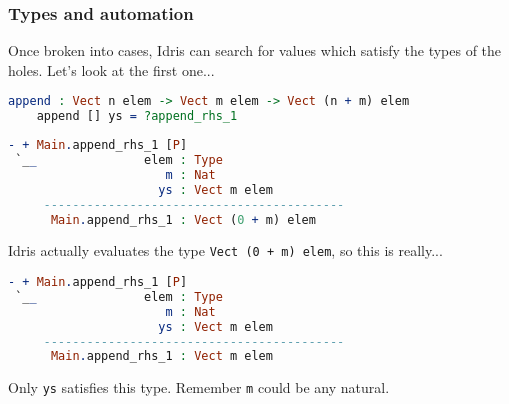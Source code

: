 \documentclass{beamer}
\begin{document}
\begin{frame}[fragile]
  \frametitle{Types and automation}

  Once broken into cases, Idris can search for values which satisfy the types of the holes. Let's look at the first one...

  \pause

  \begin{lstlisting}[language=Idris]
    append : Vect n elem -> Vect m elem -> Vect (n + m) elem
    append [] ys = ?append_rhs_1
  \end{lstlisting}

  \begin{lstlisting}[language=Idris]
- + Main.append_rhs_1 [P]
 `__               elem : Type
                      m : Nat
                     ys : Vect m elem
     ------------------------------------------
      Main.append_rhs_1 : Vect (0 + m) elem
  \end{lstlisting}

  \pause
  
  Idris actually evaluates the type \texttt{Vect (0 + m) elem}, so this is really...

  \pause

  \begin{lstlisting}[language=Idris]
- + Main.append_rhs_1 [P]
 `__               elem : Type
                      m : Nat
                     ys : Vect m elem
     ------------------------------------------
      Main.append_rhs_1 : Vect m elem
  \end{lstlisting}

  \pause

  Only \texttt{ys} satisfies this type. Remember \texttt{m} could be any natural.
\end{frame}
\end{document}
